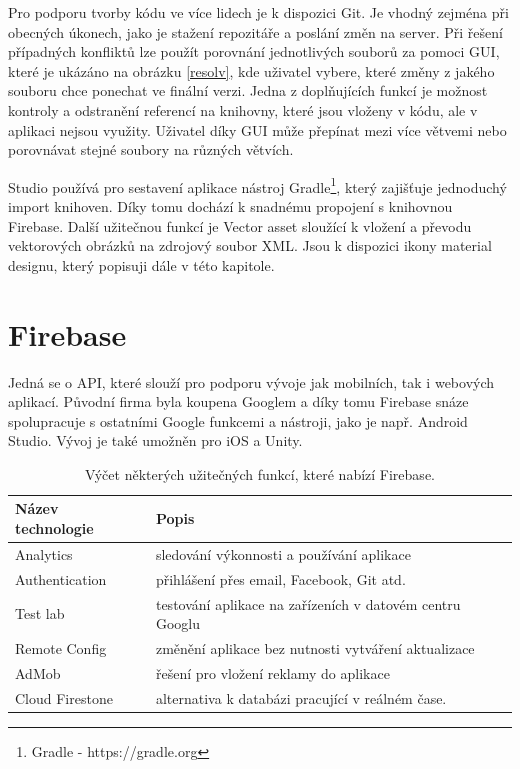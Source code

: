 Pro podporu tvorby kódu ve více lidech je k dispozici Git. Je vhodný zejména při obecných úkonech, jako je stažení repozitáře a poslání změn na server. Při řešení případných konfliktů lze použít porovnání jednotlivých souborů za pomoci GUI, které je ukázáno na obrázku \ref{resolv}, kde uživatel vybere, které změny z jakého souboru chce ponechat ve finální verzi. Jedna z doplňujících funkcí je možnost kontroly a odstranění referencí na knihovny, které jsou vloženy v kódu, ale v aplikaci nejsou využity. Uživatel díky GUI může přepínat mezi více větvemi nebo porovnávat stejné soubory na různých větvích.

Studio používá pro sestavení aplikace nástroj Gradle\footnote{Gradle - https://gradle.org}, který zajišťuje jednoduchý import knihoven. Díky tomu dochází k snadnému propojení s knihovnou Firebase. Další užitečnou funkcí je Vector asset sloužící k vložení a převodu vektorových obrázků na zdrojový soubor XML. Jsou k dispozici ikony material designu, který popisuji dále v této kapitole.  

\section{Firebase}

Jedná se o API, které slouží pro podporu vývoje jak mobilních, tak i webových aplikací. Původní firma byla koupena Googlem a díky tomu Firebase snáze spolupracuje s ostatními Google funkcemi a nástroji, jako je např. Android Studio. Vývoj je také umožněn pro iOS a Unity.

\begin{table}
\centering
    \begin{tabular}{| l | l |}
    \hline
    Název technologie & Popis \\ \hline
    Analytics & sledování výkonnosti a používání aplikace \\ \hline
  	Authentication & přihlášení přes email, Facebook, Git atd. \\ \hline
    Test lab & testování aplikace na zařízeních v datovém centru Googlu \\ \hline
    Remote Config & změnění aplikace bez nutnosti vytváření aktualizace \\ \hline
    AdMob & řešení pro vložení reklamy do aplikace \\ \hline
    Cloud Firestone & alternativa k databázi pracující v reálném čase. \\ \hline   
    \end{tabular}
    \caption{Výčet některých užitečných funkcí, které nabízí Firebase. }
    \label{table}
\end{table}

